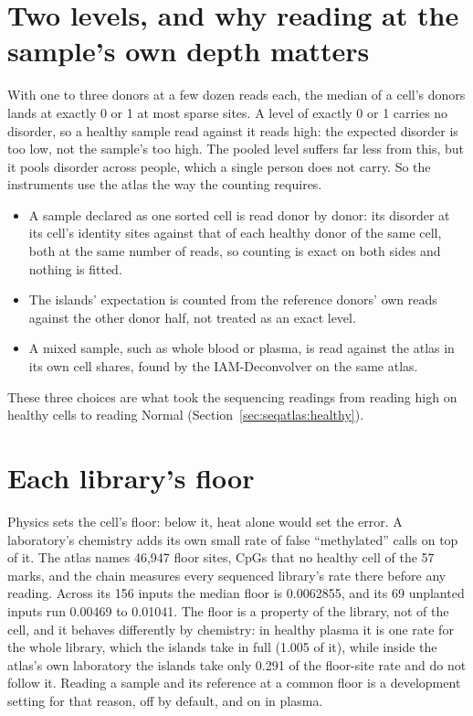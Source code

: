 \section{Two levels, and why reading at the sample's own depth matters}\label{sec:seqatlas:levels}

With one to three donors at a few dozen reads each, the median of a cell's donors lands at exactly 0 or 1 at most sparse sites. A level of exactly 0 or 1 carries no disorder, so a healthy sample read against it reads high: the expected disorder is too low, not the sample's too high. The pooled level suffers far less from this, but it pools disorder across people, which a single person does not carry. So the instruments use the atlas the way the counting requires.
\begin{itemize}
\item A sample declared as one sorted cell is read donor by donor: its disorder at its cell's identity sites against that of each healthy donor of the same cell, both at the same number of reads, so counting is exact on both sides and nothing is fitted.
\item The islands' expectation is counted from the reference donors' own reads against the other donor half, not treated as an exact level.
\item A mixed sample, such as whole blood or plasma, is read against the atlas in its own cell shares, found by the IAM-Deconvolver on the same atlas.
\end{itemize}
These three choices are what took the sequencing readings from reading high on healthy cells to reading Normal (Section~\ref{sec:seqatlas:healthy}).

\section{Each library's floor}

Physics sets the cell's floor: below it, heat alone would set the error. A laboratory's chemistry adds its own small rate of false ``methylated'' calls on top of it. The atlas names 46,947 floor sites, CpGs that no healthy cell of the 57 marks, and the chain measures every sequenced library's rate there before any reading. Across its 156 inputs the median floor is 0.0062855, and its 69 unplanted inputs run 0.00469 to 0.01041. The floor is a property of the library, not of the cell, and it behaves differently by chemistry: in healthy plasma it is one rate for the whole library, which the islands take in full (1.005 of it), while inside the atlas's own laboratory the islands take only 0.291 of the floor-site rate and do not follow it. Reading a sample and its reference at a common floor is a development setting for that reason, off by default, and on in plasma.

